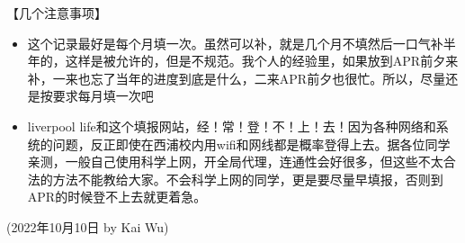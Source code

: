 \vspace{5mm}
【几个注意事项】
\begin{itemize}
    \item 这个记录最好是每个月填一次。虽然可以补，就是几个月不填然后一口气补半年的，这样是被允许的，但是不规范。我个人的经验里，如果放到APR前夕来补，一来也忘了当年的进度到底是什么，二来APR前夕也很忙。所以，尽量还是按要求每月填一次吧
    \item liverpool life和这个填报网站，经！常！登！不！上！去！因为各种网络和系统的问题，反正即使在西浦校内用wifi和网线都是概率登得上去。据各位同学亲测，一般自己使用科学上网，开全局代理，连通性会好很多，但这些不太合法的方法不能教给大家。不会科学上网的同学，更是要尽量早填报，否则到APR的时候登不上去就更着急。
\end{itemize}

\begin{flushright}
    (2022年10月10日 by Kai Wu)
    \end{flushright}